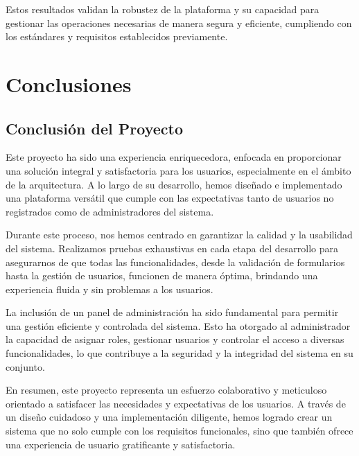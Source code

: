 \documentclass[a4paper, 12pt]{book}
\begin{document}
Estos resultados validan la robustez de la plataforma y su capacidad para gestionar las operaciones necesarias de manera segura y eficiente, cumpliendo con los 
estándares y requisitos establecidos previamente.



\cleardoublepage
\chapter{Conclusiones}
\label{chap:conclusiones}


\section{Conclusión del Proyecto}

Este proyecto ha sido una experiencia enriquecedora, enfocada en proporcionar una solución integral y satisfactoria para los usuarios, 
especialmente en el ámbito de la arquitectura. A lo largo de su desarrollo, hemos diseñado e implementado una plataforma versátil que 
cumple con las expectativas tanto de usuarios no registrados como de administradores del sistema.

Durante este proceso, nos hemos centrado en garantizar la calidad y la usabilidad del sistema. Realizamos pruebas exhaustivas en cada etapa 
del desarrollo para asegurarnos de que todas las funcionalidades, desde la validación de formularios hasta la gestión de usuarios, funcionen 
de manera óptima, brindando una experiencia fluida y sin problemas a los usuarios.

La inclusión de un panel de administración ha sido fundamental para permitir una gestión eficiente y controlada del sistema. Esto ha otorgado al 
administrador la capacidad de asignar roles, gestionar usuarios y controlar el acceso a diversas funcionalidades, lo que contribuye a la seguridad 
y la integridad del sistema en su conjunto.

En resumen, este proyecto representa un esfuerzo colaborativo y meticuloso orientado a satisfacer las necesidades y expectativas de los usuarios. 
A través de un diseño cuidadoso y una implementación diligente, hemos logrado crear un sistema que no solo cumple con los requisitos funcionales, 
sino que también ofrece una experiencia de usuario gratificante y satisfactoria.
\end{document}
